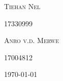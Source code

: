 \begin{titlepage}
\begin{center}
		\begin{minipage}{0.4\textwidth}
			\begin{flushleft} \large
				\textsc{Tiehan Nel} %
			\end{flushleft}
		\end{minipage}
		\begin{minipage}{0.4\textwidth}
			\begin{flushright} \large
				17330999 %
			\end{flushright}
		\end{minipage}


		\begin{minipage}{0.4\textwidth}
			\begin{flushleft} \large
				\textsc{Anro v.d. Merwe} %
			\end{flushleft}
		\end{minipage}
		\begin{minipage}{0.4\textwidth}
			\begin{flushright} \large
				17004812 %
			\end{flushright}
		\end{minipage}


		\vfill
		{\large \today}
	\end{center}
\end{titlepage}
